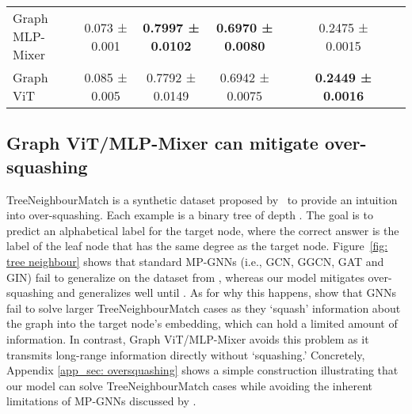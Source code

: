 \documentclass{article}
\begin{document}
\begin{table}[t]
\begin{tabular}{lcccccccc}
         \midrule
         Graph MLP-Mixer
         & {0.073 ± 0.001} & \bf {0.7997 ± 0.0102} & \bf{0.6970 ± 0.0080} &  &   
         & 0.2475 ± 0.0015 &  &   \\
         Graph ViT
         & {0.085 ± 0.005} & {0.7792 ± 0.0149} & {0.6942 ± 0.0075} &   &  
         & \bf{0.2449 ± 0.0016} &  &   
         \\
         \bottomrule
    \end{tabular}  
\end{table}



\subsection{Graph ViT/MLP-Mixer can mitigate over-squashing}\label{sec: oversquashing}


TreeNeighbourMatch is a synthetic dataset proposed by~\citet{alon2020bottleneck} to provide an intuition into over-squashing. Each example is a binary tree of depth . The goal is to predict an alphabetical label for the target node, where the correct answer is the label of the leaf node that has the same degree as the target node. Figure~\ref{fig: tree neighbour} shows that standard MP-GNNs (i.e., GCN, GGCN, GAT and GIN) fail to generalize on the dataset from , whereas
our model mitigates over-squashing and generalizes well until .
As for why this happens, \citet{alon2020bottleneck} show that GNNs fail to solve larger TreeNeighbourMatch cases as they `squash' information about the graph into the target node's embedding, which can hold a limited amount of information. In contrast, Graph ViT/MLP-Mixer avoids this problem as it transmits long-range information directly without `squashing.' Concretely, Appendix \ref{app_sec: oversquashing} shows a simple construction illustrating that our model can solve TreeNeighbourMatch cases while avoiding the inherent limitations of MP-GNNs discussed by \citet{alon2020bottleneck}.
\end{document}
